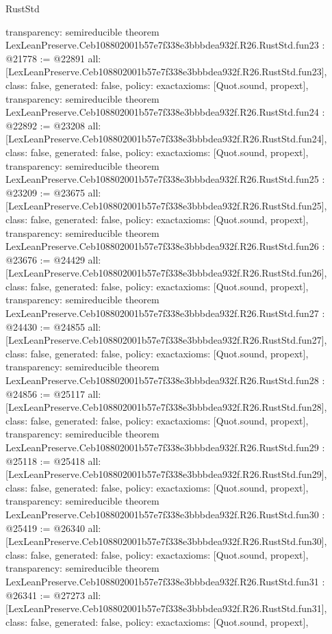 \begin{lexlean}{RustStd}
\begin{coremodule}
{  transparency: semireducible
}
theorem LexLeanPreserve.Ceb108802001b57e7f338e3bbbdea932f.R26.RustStd.fun23 : @21778 := @22891 {
  all: [LexLeanPreserve.Ceb108802001b57e7f338e3bbbdea932f.R26.RustStd.fun23],
  class: false,
  generated: false,
  policy: exact{axioms: [Quot.sound, propext]},
  transparency: semireducible
}
theorem LexLeanPreserve.Ceb108802001b57e7f338e3bbbdea932f.R26.RustStd.fun24 : @22892 := @23208 {
  all: [LexLeanPreserve.Ceb108802001b57e7f338e3bbbdea932f.R26.RustStd.fun24],
  class: false,
  generated: false,
  policy: exact{axioms: [Quot.sound, propext]},
  transparency: semireducible
}
theorem LexLeanPreserve.Ceb108802001b57e7f338e3bbbdea932f.R26.RustStd.fun25 : @23209 := @23675 {
  all: [LexLeanPreserve.Ceb108802001b57e7f338e3bbbdea932f.R26.RustStd.fun25],
  class: false,
  generated: false,
  policy: exact{axioms: [Quot.sound, propext]},
  transparency: semireducible
}
theorem LexLeanPreserve.Ceb108802001b57e7f338e3bbbdea932f.R26.RustStd.fun26 : @23676 := @24429 {
  all: [LexLeanPreserve.Ceb108802001b57e7f338e3bbbdea932f.R26.RustStd.fun26],
  class: false,
  generated: false,
  policy: exact{axioms: [Quot.sound, propext]},
  transparency: semireducible
}
theorem LexLeanPreserve.Ceb108802001b57e7f338e3bbbdea932f.R26.RustStd.fun27 : @24430 := @24855 {
  all: [LexLeanPreserve.Ceb108802001b57e7f338e3bbbdea932f.R26.RustStd.fun27],
  class: false,
  generated: false,
  policy: exact{axioms: [Quot.sound, propext]},
  transparency: semireducible
}
theorem LexLeanPreserve.Ceb108802001b57e7f338e3bbbdea932f.R26.RustStd.fun28 : @24856 := @25117 {
  all: [LexLeanPreserve.Ceb108802001b57e7f338e3bbbdea932f.R26.RustStd.fun28],
  class: false,
  generated: false,
  policy: exact{axioms: [Quot.sound, propext]},
  transparency: semireducible
}
theorem LexLeanPreserve.Ceb108802001b57e7f338e3bbbdea932f.R26.RustStd.fun29 : @25118 := @25418 {
  all: [LexLeanPreserve.Ceb108802001b57e7f338e3bbbdea932f.R26.RustStd.fun29],
  class: false,
  generated: false,
  policy: exact{axioms: [Quot.sound, propext]},
  transparency: semireducible
}
theorem LexLeanPreserve.Ceb108802001b57e7f338e3bbbdea932f.R26.RustStd.fun30 : @25419 := @26340 {
  all: [LexLeanPreserve.Ceb108802001b57e7f338e3bbbdea932f.R26.RustStd.fun30],
  class: false,
  generated: false,
  policy: exact{axioms: [Quot.sound, propext]},
  transparency: semireducible
}
theorem LexLeanPreserve.Ceb108802001b57e7f338e3bbbdea932f.R26.RustStd.fun31 : @26341 := @27273 {
  all: [LexLeanPreserve.Ceb108802001b57e7f338e3bbbdea932f.R26.RustStd.fun31],
  class: false,
  generated: false,
  policy: exact{axioms: [Quot.sound, propext]},
}
\end{coremodule}
\end{lexlean}
